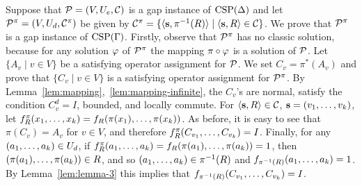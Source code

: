 Suppose that ${\mathcal P}=(V,U_e,{\mathcal C})$ is a gap instance of ${\rm CSP}(\Delta)$ and let ${\mathcal P}^\pi=(V,U_d,{\mathcal C}^\pi)$ be given by ${\mathcal C}^\pi=\{\langle {\bf s},\pi^{-1}(R) \rangle\mid \langle {\bf s},R \rangle\in{\mathcal C}\}$. We prove that ${\mathcal P}^\pi$ is a gap instance of ${\rm CSP}(\Gamma)$. Firstly, observe that ${\mathcal P}^\pi$ has no classic solution, because for any solution $\varphi$ of ${\mathcal P}^\pi$ the mapping $\pi\circ\varphi$ is a solution of ${\mathcal P}$. Let $\{A_v\mid v\in V\}$ be a satisfying operator assignment for ${\mathcal P}$. We set $C_v=\pi^*(A_v)$ and prove that $\{C_v\mid v\in V\}$ is a satisfying operator assignment for ${\mathcal P}^\pi$. By Lemma~\ref{lem:mapping},~\ref{lem:mapping-infinite}, the $C_v$'s are normal, satisfy the condition $C_v^d=I$, bounded, and locally commute. For $\langle {\bf s},R \rangle\in{\mathcal C}$, ${\bf s}=(v _1,\ldots, v _{k})$, let $f^\pi_R(x _1,\ldots, x _{k})=f_R(\pi(x_1),\ldots,\pi(x_k))$. As before, it is easy to see that $\pi(C_v)=A_v$ for $v\in V$, and therefore $f^\pi_R(C_{v_1},\ldots, C_{v_k})=I$. Finally, for any $(a _1,\ldots, a _{k})\in U_d$, if $f^\pi_R(a _1,\ldots, a _{k})=f_R(\pi(a_1),\ldots,\pi(a_k))=1$, then $(\pi(a_1),\ldots,\pi(a_k))\in R$, and so $(a _1,\ldots, a _{k})\in\pi^{-1}(R)$ and $f_{\pi^{-1}(R)}(a _1,\ldots, a _{k})=1$. By Lemma~\ref{lem:lemma-3} this implies that $f_{\pi^{-1}(R)}(C_{v_1},\ldots, C_{v_k})=I$.



